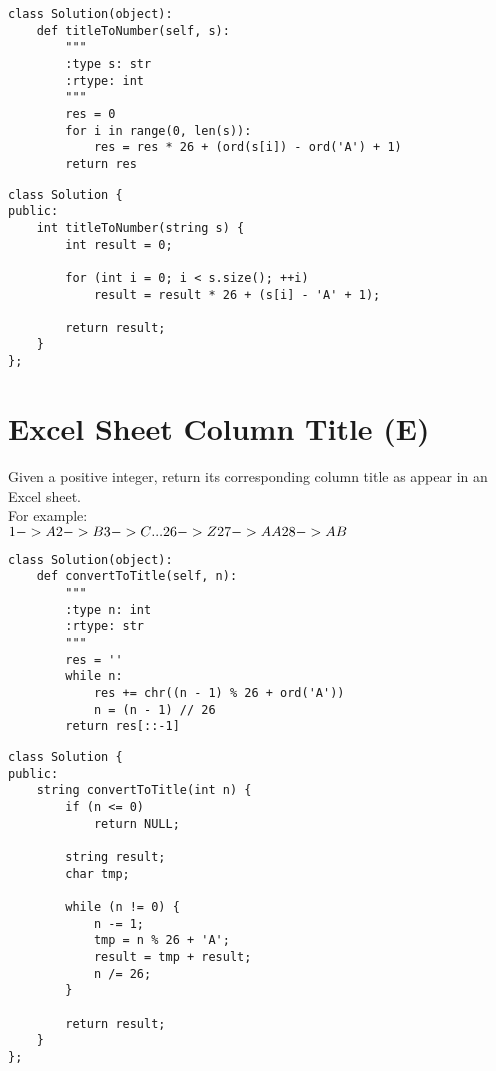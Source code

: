 \begin{lstlisting}
class Solution(object):
    def titleToNumber(self, s):
        """
        :type s: str
        :rtype: int
        """
        res = 0
        for i in range(0, len(s)):
            res = res * 26 + (ord(s[i]) - ord('A') + 1)
        return res
\end{lstlisting}

\begin{lstlisting}
class Solution {
public:
    int titleToNumber(string s) {
        int result = 0;
        
        for (int i = 0; i < s.size(); ++i)
            result = result * 26 + (s[i] - 'A' + 1);
            
        return result;
    }
};
\end{lstlisting}


\section{Excel Sheet Column Title (E)}
Given a positive integer, return its corresponding column title as appear in an Excel sheet.\\

For example:\\
$
    1 -> A\\
    2 -> B\\
    3 -> C\\
    ...\\
    26 -> Z\\
    27 -> AA\\
    28 -> AB \\$
    
\begin{lstlisting}    
class Solution(object):
    def convertToTitle(self, n):
        """
        :type n: int
        :rtype: str
        """
        res = ''
        while n:
            res += chr((n - 1) % 26 + ord('A'))
            n = (n - 1) // 26
        return res[::-1]
\end{lstlisting}
        
\begin{lstlisting}
class Solution {
public:
    string convertToTitle(int n) {
        if (n <= 0)
            return NULL;
            
        string result;
        char tmp;
        
        while (n != 0) {
            n -= 1;
            tmp = n % 26 + 'A';
            result = tmp + result;            
            n /= 26;
        }
        
        return result;
    }
};
\end{lstlisting}   


